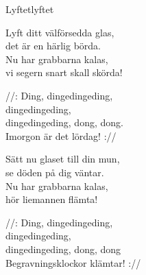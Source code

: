 \begin{song}{Lyftet}{lyftet}
\begin{vers}
Lyft ditt välförsedda glas,\\
det är en härlig börda.\\
Nu har grabbarna kalas,\\
vi segern snart skall skörda!\\
\end{vers}
\begin{vers}
//: Ding, dingedingeding,\\
dingedingeding,\\
dingedingeding, dong, dong.\\
Imorgon är det lördag! ://\\
\end{vers}
\begin{vers}
Sätt nu glaset till din mun,\\
se döden på dig väntar.\\
Nu har grabbarna kalas,\\
hör liemannen flämta!\\
\end{vers}
\begin{vers}
//: Ding, dingedingeding,\\
dingedingeding,\\
dingedingeding, dong, dong\\
Begravningsklockor klämtar! ://\\
\end{vers}
\end{song}
